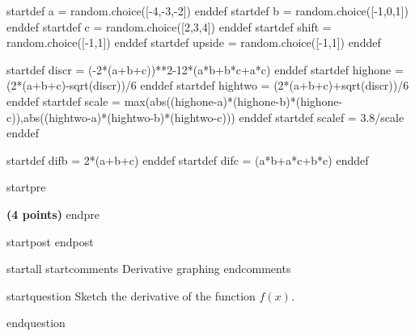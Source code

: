 startdef a = random.choice([-4,-3,-2]) enddef
startdef b = random.choice([-1,0,1]) enddef
startdef c = random.choice([2,3,4]) enddef
startdef shift = random.choice([-1,1]) enddef
startdef upside = random.choice([-1,1]) enddef

startdef discr = (-2*(a+b+c))**2-12*(a*b+b*c+a*c) enddef
startdef highone = (2*(a+b+c)-sqrt(discr))/6 enddef
startdef hightwo = (2*(a+b+c)+sqrt(discr))/6 enddef
startdef scale = max(abs((highone-a)*(highone-b)*(highone-c)),abs((hightwo-a)*(hightwo-b)*(hightwo-c))) enddef
startdef scalef = 3.8/scale enddef

startdef difb = 2*(a+b+c) enddef
startdef difc = (a*b+a*c+b*c) enddef

startpre \item {\bf (4 points)} endpre

startpost
\vspace{2cm}
endpost



startall
startcomments 
Derivative graphing
endcomments

startquestion Sketch the derivative of the function $f(x)$.

\begin{multicols}{2}

 \end{multicols}
endquestion

